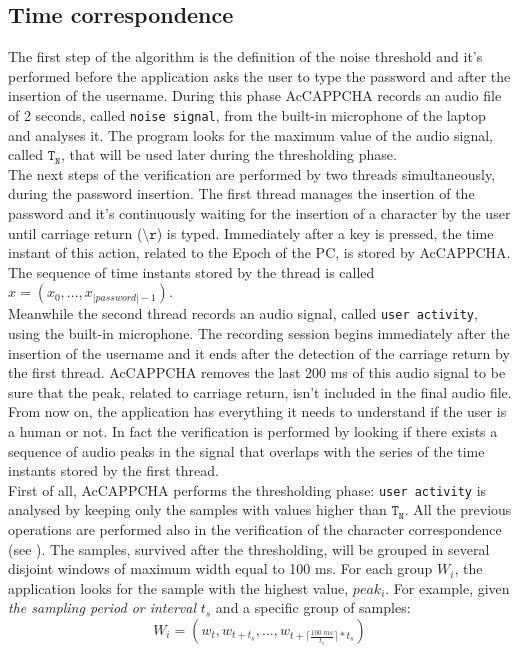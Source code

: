 \subsection{Time correspondence}\label{AcCAPPCHA:time_correspondence}
The first step of the algorithm is the definition of the noise threshold and it's performed before the application asks the user to type the password and after the insertion of the username. During this phase AcCAPPCHA records an audio file of 2 seconds, called \texttt{noise signal}, from the built-in microphone of the laptop and analyses it. The program looks for the maximum value of the audio signal, called $\mathtt{T_N}$, that will be used later during the thresholding phase.\\
The next steps of the verification are performed by two threads simultaneously, during the password insertion. The first thread manages the insertion of the password and it's continuously waiting for the insertion of a character by the user until carriage return ($\mathtt{\setminus r}$) is typed. Immediately after a key is pressed, the time instant of this action, related to the Epoch of the PC, is stored by AcCAPPCHA. The sequence of time instants stored by the thread is called $x=(x_0, ..., x_{|password|-1})$.\\
Meanwhile the second thread records an audio signal, called \texttt{user activity}, using the built-in microphone. The recording session begins immediately after the insertion of the username and it ends after the detection of the carriage return by the first thread. AcCAPPCHA removes the last 200 ms of this audio signal to be sure that the peak, related to carriage return, isn't included in the final audio file.\\
From now on, the application has everything it needs to understand if the user is a human or not. In fact the verification is performed by looking if there exists a sequence of audio peaks in the signal that overlaps with the series of the time instants stored by the first thread.\\
First of all, AcCAPPCHA performs the thresholding phase: \texttt{user activity} is analysed by keeping only the samples with values higher than $\mathtt{T_N}$. All the previous operations are performed also in the verification of the character correspondence (see ). The samples, survived after the thresholding, will be grouped in several disjoint windows of maximum width equal to 100 ms. For each group $W_i$, the application looks for the sample with the highest value, $peak_i$. For example, given \textit{the sampling period or interval} $t_s$ and a specific group of samples: $$W_i = (w_t, w_{t+t_s}, ..., w_{t+\lceil \frac{100\;ms}{t_s}\rceil * t_s})$$
